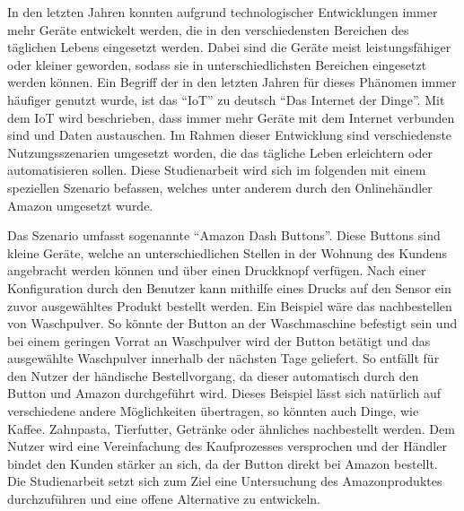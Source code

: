 In den letzten Jahren konnten aufgrund technologischer Entwicklungen immer mehr Geräte entwickelt werden, die in den verschiedensten Bereichen des täglichen Lebens eingesetzt werden. Dabei sind die Geräte meist leistungsfähiger oder kleiner geworden, sodass sie in unterschiedlichsten Bereichen eingesetzt werden können. Ein Begriff der in den letzten Jahren für dieses Phänomen immer häufiger genutzt wurde, ist das ``\ac{IoT}'' zu deutsch ``Das Internet der Dinge''. Mit dem \ac{IoT} wird beschrieben, dass immer mehr Geräte mit dem Internet verbunden sind und Daten austauschen. Im Rahmen dieser Entwicklung sind verschiedenste Nutzungsszenarien umgesetzt worden, die das tägliche Leben erleichtern oder automatisieren sollen. Diese Studienarbeit wird sich im folgenden mit einem speziellen Szenario befassen, welches unter anderem durch den Onlinehändler Amazon umgesetzt wurde.

Das Szenario umfasst sogenannte ``Amazon Dash Buttons''. Diese Buttons sind kleine Geräte, welche an unterschiedlichen Stellen in der Wohnung des Kundens angebracht werden können und über einen Druckknopf verfügen. Nach einer Konfiguration durch den Benutzer kann mithilfe eines Drucks auf den Sensor ein zuvor ausgewähltes Produkt bestellt werden. Ein Beispiel wäre das nachbestellen von Waschpulver. So könnte der Button an der Waschmaschine befestigt sein und bei einem geringen Vorrat an Waschpulver wird der Button betätigt und das ausgewählte Waschpulver innerhalb der nächsten Tage geliefert. So entfällt für den Nutzer der händische Bestellvorgang, da dieser automatisch durch den Button und Amazon durchgeführt wird. Dieses Beispiel lässt sich natürlich auf verschiedene andere Möglichkeiten übertragen, so könnten auch Dinge, wie Kaffee. Zahnpasta, Tierfutter, Getränke oder ähnliches nachbestellt werden. Dem Nutzer wird eine Vereinfachung des Kaufprozesses versprochen und der Händler bindet den Kunden stärker an sich, da der Button direkt bei Amazon bestellt. 
Die Studienarbeit setzt sich zum Ziel eine Untersuchung des Amazonproduktes durchzuführen und eine offene Alternative zu entwickeln. 

